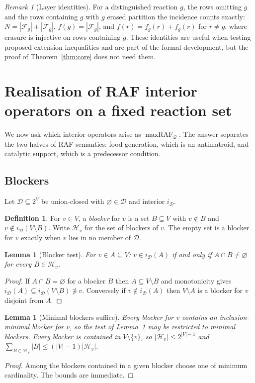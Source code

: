 \documentclass[11pt,a4paper]{article}
\theoremstyle{plain}
\newtheorem{lemma}[theorem]{Lemma}
\theoremstyle{definition}
\newtheorem{definition}[theorem]{Definition}
\theoremstyle{remark}
\newtheorem{remark}[theorem]{Remark}
\newcommand{\FF}{\mathcal F}
\newcommand{\DD}{\mathcal D}
\newcommand{\HH}{\mathcal H}
\newcommand{\QQ}{\mathcal Q}
\newcommand{\mraf}{\operatorname{maxRAF}}
\begin{document}
\begin{remark}[Layer identities]
For a distinguished reaction $g$, the rows omitting $g$ and the rows containing $g$ with
$g$ erased partition the incidence counts exactly: $N=|\FF_{\bar g}|+|\FF_g|$, $f(g)=|\FF_g|$,
and $f(r)=f_{\bar g}(r)+f_g(r)$ for $r\neq g$, where erasure is injective on rows containing
$g$. These identities are useful when testing proposed extension inequalities and are part
of the formal development, but the proof of Theorem~\ref{thm:core} does not need them.
\end{remark}

\section{Realisation of RAF interior operators on a fixed reaction set}\label{sec:realization}

We now ask which interior operators arise as $\mraf_\QQ$. The answer separates the two
halves of RAF semantics: food generation, which is an antimatroid, and catalytic support,
which is a predecessor condition.

\subsection{Blockers}

Let $\DD\subseteq2^V$ be union-closed with $\varnothing\in\DD$ and interior $i_\DD$.

\begin{definition}
For $v\in V$, a \emph{blocker} for $v$ is a set $B\subseteq V$ with $v\notin B$ and
$v\notin i_\DD(V\setminus B)$. Write $\HH_v$ for the set of blockers of $v$. The empty set is
a blocker for $v$ exactly when $v$ lies in no member of $\DD$.
\end{definition}

\begin{lemma}[Blocker test]\label{lem:block}
For $v\in A\subseteq V$: $v\in i_\DD(A)$ if and only if $A\cap B\neq\varnothing$ for every
$B\in\HH_v$.
\end{lemma}
\begin{proof}
If $A\cap B=\varnothing$ for a blocker $B$ then $A\subseteq V\setminus B$ and monotonicity gives
$i_\DD(A)\subseteq i_\DD(V\setminus B)\not\ni v$. Conversely if $v\notin i_\DD(A)$ then
$V\setminus A$ is a blocker for $v$ disjoint from $A$.
\end{proof}

\begin{lemma}[Minimal blockers suffice]\label{lem:minimal}
Every blocker for $v$ contains an inclusion-minimal blocker for $v$, so the test of
Lemma~\ref{lem:block} may be restricted to minimal blockers. Every blocker is contained in
$V\setminus\{v\}$, so $|\HH_v|\le2^{|V|-1}$ and $\sum_{B\in\HH_v}|B|\le(|V|-1)|\HH_v|$.
\end{lemma}
\begin{proof}
Among the blockers contained in a given blocker choose one of minimum cardinality. The
bounds are immediate.
\end{proof}
\end{document}
